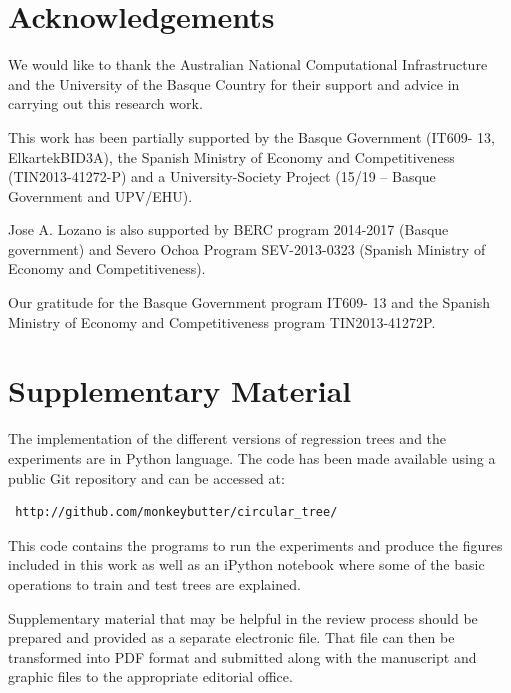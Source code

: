 \documentclass[times,twocolumn,final,authoryear]{elsarticle}
\begin{document}
\section*{Acknowledgements}

We would like to thank the Australian National Computational Infrastructure and the University of the Basque Country for their support and advice in carrying out this research work.

This work has been partially supported by the Basque Government (IT609-
13, ElkartekBID3A), the Spanish Ministry of Economy and Competitiveness (TIN2013-41272-P) and a University-Society Project (15/19 – Basque Government and UPV/EHU). 

Jose A. Lozano is also supported by BERC program 2014-2017 (Basque government) and Severo Ochoa Program SEV-2013-0323 (Spanish Ministry of Economy and Competitiveness).

Our gratitude for the Basque Government program IT609- 13 and the Spanish Ministry of Economy and Competitiveness program TIN2013-41272P.






\section*{Supplementary Material}

The implementation of the different versions of regression trees and the experiments are in Python language. The code has been made available using a public Git repository and can be accessed at:

\begin{verbatim}
 http://github.com/monkeybutter/circular_tree/
\end{verbatim}

This code contains the programs to run the experiments and produce the figures included in this work as well as an iPython notebook where some of the basic operations to train and test trees are explained.

Supplementary material that may be helpful in the review process should be prepared and provided as a separate electronic file. That file can then be transformed into PDF format and submitted along with the manuscript and graphic files to the appropriate editorial office.
\end{document}
